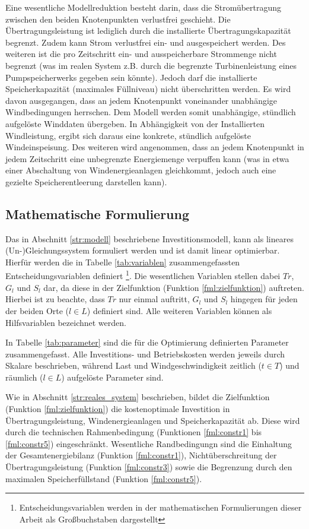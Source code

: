 Eine wesentliche Modellreduktion besteht darin, dass die Stromübertragung zwischen den beiden Knotenpunkten verlustfrei geschieht. Die Übertragungsleistung ist lediglich durch die installierte Übertragungskapazität begrenzt. Zudem kann Strom verlustfrei ein- und ausgespeichert werden. Des weiteren ist die pro Zeitschritt ein- und ausspeicherbare Strommenge nicht begrenzt (was im realen System z.B. durch die begrenzte Turbinenleistung eines Pumpspeicherwerks gegeben sein könnte). Jedoch darf die installierte Speicherkapazität (maximales Füllniveau) nicht überschritten werden. Es wird davon ausgegangen, dass an jedem Knotenpunkt voneinander unabhängige Windbedingungen herrschen. Dem Modell werden somit unabhängige, stündlich aufgelöste Winddaten übergeben. In Abhängigkeit von der Installierten Windleistung, ergibt sich daraus eine konkrete, stündlich aufgelöste Windeinspeisung. Des weiteren wird angenommen, dass an jedem Knotenpunkt in jedem Zeitschritt eine unbegrenzte Energiemenge \glqq verpuffen\grqq{} kann (was in etwa einer Abschaltung von Windenergieanlagen gleichkommt, jedoch auch eine gezielte Speicherentleerung darstellen kann).

\subsection{Mathematische Formulierung} \label{str:mathematisch}

Das in Abschnitt \ref{str:modell} beschriebene Investitionsmodell, kann als lineares (Un-)Gleichungssystem formuliert werden und ist damit linear optimierbar. Hierfür werden die in Tabelle \ref{tab:variablen} zusammengefassten Entscheidungsvariablen definiert \footnote{Entscheidungsvariablen werden in der mathematischen Formulierungen dieser Arbeit als Großbuchstaben dargestellt}. Die wesentlichen Variablen stellen dabei $Tr$, $G_{l}$ und $S_{l}$ dar, da diese in der Zielfunktion (Funktion \ref{fml:zielfunktion}) auftreten. Hierbei ist zu beachte, dass $Tr$ nur einmal auftritt, $G_{l}$ und $S_{l}$ hingegen für jeden der beiden Orte ($l \in L$) definiert sind. Alle weiteren Variablen können als Hilfsvariablen bezeichnet werden.

In Tabelle \ref{tab:parameter} sind die für die Optimierung definierten Parameter zusammengefasst. Alle Investitions- und Betriebskosten werden jeweils durch Skalare beschrieben, während Last und Windgeschwindigkeit zeitlich ($t \in T$) und räumlich ($l \in L$) aufgelöste Parameter sind. 

Wie in Abschnitt \ref{str:reales_system} beschrieben, bildet die Zielfunktion (Funktion \ref{fml:zielfunktion}) die kostenoptimale Investition in Übertragungsleistung, Windenergieanlagen und Speicherkapazität ab. Diese wird durch die technischen Rahmenbedingung (Funktionen \ref{fml:constr1} bis \ref{fml:constr5}) eingeschränkt. Wesentliche Randbedingungn sind die Einhaltung der Gesamtenergiebilanz (Funktion \ref{fml:constr1}), Nichtüberschreitung der Übertragungsleistung (Funktion \ref{fml:constr3}) sowie die Begrenzung durch den maximalen Speicherfüllstand (Funktion \ref{fml:constr5}).

